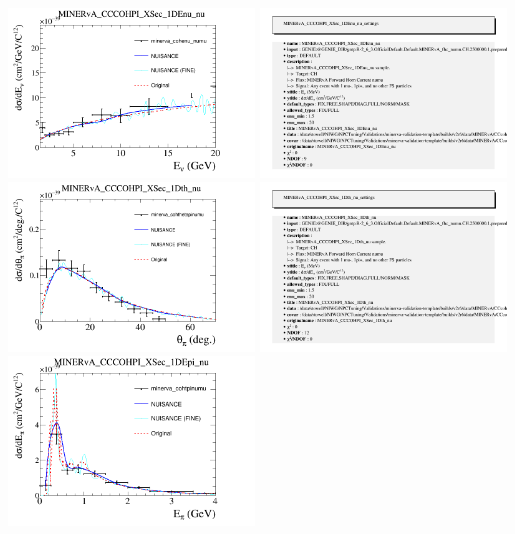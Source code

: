 \documentclass{article}
\begin{document}
\centering
\includegraphics[width=0.49\textwidth]{figures/minerva_cohenu_numu_comp.png}
\includegraphics[width=0.49\textwidth]{figures/minerva_cohenu_numu_info.png}
\centering
\includegraphics[width=0.49\textwidth]{figures/minerva_cohthetapinumu_comp.png}
\includegraphics[width=0.49\textwidth]{figures/minerva_cohthetapinumu_info.png}
\centering
\includegraphics[width=0.49\textwidth]{figures/minerva_cohtpinumu_comp.png}
\end{document}
